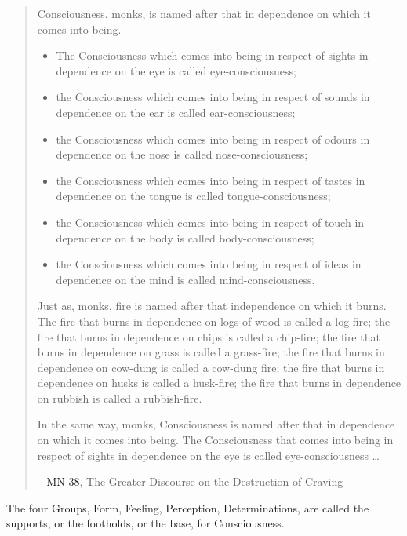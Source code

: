 \begin{quote}
Consciousness, monks, is named after that in dependence on which it comes into being.

\begin{itemize}
\item
  The Consciousness which comes into being in respect of sights in dependence on the eye is called eye-consciousness;
\item
  the Consciousness which comes into being in respect of sounds in dependence on the ear is called ear-consciousness;
\item
  the Consciousness which comes into being in respect of odours in dependence on the nose is called nose-consciousness;
\item
  the Consciousness which comes into being in respect of tastes in dependence on the tongue is called tongue-consciousness;
\item
  the Consciousness which comes into being in respect of touch in dependence on the body is called body-consciousness;
\item
  the Consciousness which comes into being in respect of ideas in dependence on the mind is called mind-consciousness.
\end{itemize}

Just as, monks, fire is named after that independence on which it burns. The fire that burns in dependence on logs of wood is called a log-fire; the fire that burns in dependence on chips is called a chip-fire; the fire that burns in dependence on grass is called a grass-fire; the fire that burns in dependence on cow-dung is called a cow-dung fire; the fire that burns in dependence on husks is called a husk-fire; the fire that burns in dependence on rubbish is called a rubbish-fire.

In the same way, monks, Consciousness is named after that in dependence on which it comes into being. The Consciousness that comes into being in respect of sights in dependence on the eye is called eye-consciousness \ldots{}

 -- \href{https://suttacentral.net/mn38/en/bodhi}{MN 38}, The Greater Discourse on the Destruction of Craving
\end{quote}

The four Groups, Form, Feeling, Perception, Determinations, are called the supports, or the footholds, or the base, for Consciousness.

